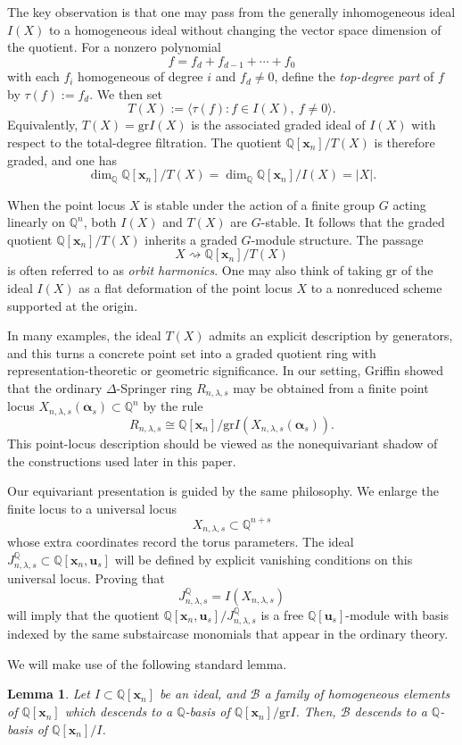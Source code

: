 \documentclass[11pt]{amsart}
\numberwithin{equation}{section}
\newtheorem{lemma}[theorem]{Lemma}
\theoremstyle{definition}
\newcommand{\gr}{{\mathrm {gr}}}
\newcommand{\BBB}{{\mathcal{B}}}
\newcommand{\QQ}{{\mathbb{Q}}}
\newcommand{\xxx}{{\mathbf{x}}}
\newcommand{\uuu}{{\mathbf{u}}}
\newcommand{\aalpha}{{{\bm \alpha}}}
\begin{document}
The key observation is that one may pass from the generally inhomogeneous ideal $I(X)$
to a homogeneous ideal without changing the vector space dimension of the quotient.
For a nonzero polynomial
\[
f=f_d+f_{d-1}+\cdots+f_0
\]
with each $f_i$ homogeneous of degree $i$ and $f_d\neq 0$, define the
\emph{top-degree part} of $f$ by $\tau(f):=f_d$. We then set
\[
T(X):=\langle \tau(f) : f\in I(X),\ f\neq 0\rangle.
\]
Equivalently, $T(X)=\gr I(X)$ is the associated graded ideal of $I(X)$ with respect
to the total-degree filtration. The quotient $\QQ[\xxx_n]/T(X)$ is therefore graded,
and one has
\[
\dim_\QQ \QQ[\xxx_n]/T(X)=\dim_\QQ \QQ[\xxx_n]/I(X)=|X|.
\]

When the point locus $X$ is stable under the action of a finite group $G$ acting linearly
on $\QQ^n$, both $I(X)$ and $T(X)$ are $G$-stable. It follows that the graded quotient
$\QQ[\xxx_n]/T(X)$ inherits a graded $G$-module structure. The passage
\[
X \rightsquigarrow \QQ[\xxx_n]/T(X)
\]
is often referred to as \emph{orbit harmonics}. One may also think of taking $\gr$ of the ideal $I(X)$ as a flat deformation of the point locus $X$ to a nonreduced scheme supported at the origin.

In many examples, the ideal $T(X)$ admits an explicit description by generators, and
this turns a concrete point set into a graded quotient ring with representation-theoretic
or geometric significance. In our setting, Griffin showed that the ordinary
$\Delta$-Springer ring $R_{n,\lambda,s}$ may be obtained from a finite point locus
$X_{n,\lambda,s}(\aalpha_s)\subset \QQ^n$ by the rule
\[
R_{n,\lambda,s}\cong \QQ[\xxx_n]/\gr I(X_{n,\lambda,s}(\aalpha_s)).
\]
This point-locus description should be viewed as the nonequivariant shadow of the
constructions used later in this paper.

Our equivariant presentation is guided by the same philosophy. We enlarge the finite
locus to a universal locus
\[
X_{n,\lambda,s}\subset \QQ^{n+s}
\]
whose extra coordinates record the torus parameters. The ideal
$J^\QQ_{n,\lambda,s}\subset \QQ[\xxx_n,\uuu_s]$ will be defined by explicit vanishing
conditions on this universal locus. Proving that
\[
J^\QQ_{n,\lambda,s}=I(X_{n,\lambda,s})
\]
will imply that the quotient $\QQ[\xxx_n,\uuu_s]/J^\QQ_{n,\lambda,s}$ is a free
$\QQ[\uuu_s]$-module with basis indexed by the same substaircase monomials that appear
in the ordinary theory. 

We will make use of the following standard lemma.
\begin{lemma}\label{lem: basis-gr-imply-basis}
    Let $I \subset \QQ[\xxx_n]$ be an ideal, and $\BBB$ a family of homogeneous elements of $\QQ[\xxx_n]$ which descends to a $\QQ$-basis of $\QQ[\xxx_n]/\gr I$. Then, $\BBB$ descends to a $\QQ$-basis of $\QQ[\xxx_n]/I$.
\end{lemma}
\end{document}
